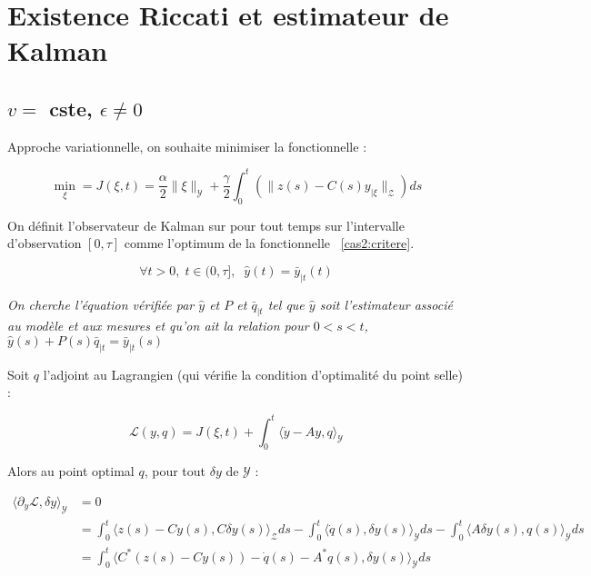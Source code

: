 \documentclass[a4paper]{article}
\begin{document}
\section{Existence Riccati et estimateur de Kalman}


\subsection{$v =$ cste, $\epsilon \ne 0$}

Approche variationnelle, on souhaite minimiser la fonctionnelle :

\begin{equation}
	\label{cas2:critere}
	\displaystyle
	\min_{\xi} = J(\xi,t) = \frac{\alpha}{2}\|\xi \|_{\mathscr{Y}} 
	                      + \frac{\gamma}{2}\int_0^t (\|z(s)-C(s)y_{| \xi}\|_{\mathscr{Z}})ds
\end{equation}


On définit l'observateur de Kalman sur pour tout temps sur l'intervalle 
d'observation $[0,\tau]$ comme l'optimum de la fonctionnelle ~\eqref{cas2:critere}.

\[ \forall t>0, \; t\in (0,\tau], \; \; \hat{y}(t) = \bar{y}_{|t}(t) \]

\textit{On cherche l'équation vérifiée par $\hat{y}$ 
et $P$ et $\bar{q}_{|t}$ tel que 
$\hat{y}$ soit l'estimateur associé au modèle et aux mesures
et qu'on ait la relation pour $0<s<t$, 
$\hat{y}(s)+ P(s)\bar{q}_{|t} = \bar{y}_{|t}(s)$}

\vspace{0.3cm}
Soit $q$ l'adjoint au Lagrangien (qui vérifie la condition d'optimalité du point selle) :

\[ 
\mathscr{L}(y,q)= J(\xi,t)+\int_0^t \langle \dot{y}-Ay, q \rangle_{\mathscr{Y}}
\]

Alors au point optimal $q$, pour tout $\delta y$ de $\mathscr{Y}$ :

\[
\begin{split}
\langle \partial_y \mathscr{L}, \delta y \rangle_{\mathscr{Y}} & =0 \\ 
          &= \int_0^t \langle z(s) - Cy(s), C \delta y(s) \rangle_{\mathscr{Z}}ds
		   - \int_0^t \langle \dot{q}(s), \delta y(s) \rangle_{\mathscr{Y}}ds
		   - \int_0^t \langle A \delta y(s), q(s) \rangle_{\mathscr{Y}} ds\\
		  & = \int_0^t \langle C^* (z(s) - Cy(s))
		   - \dot{q}(s)
		   -A^* q(s)
		   , \delta y(s) \rangle_{\mathscr{Y}} ds
\end{split}
\]
\end{document}
